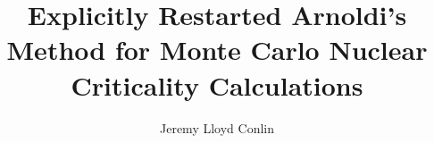 \documentclass[12pt]{JLCthesis}
\title{Explicitly Restarted Arnoldi's Method for Monte Carlo Nuclear Criticality Calculations}
\author{Jeremy Lloyd Conlin}
\begin{document}
\frontmatter



\mainmatter
\begin{comment}
\pagediagram
\currentpage
\reversemarginpartrue
\pagedesign

The textwidth is \printinunitsof{pt}\prntlen{\textwidth} which is also \printinunitsof{in}\prntlen{\textwidth} or \printinunitsof{mm}\prntlen{\textwidth}. 

The textheight is \printinunitsof{pt}\prntlen{\textheight} which is also \printinunitsof{in}\prntlen{\textheight} or \printinunitsof{mm}\prntlen{\textheight}. 
\end{comment}












\appendix
\renewcommand{\chaptername}{\appendixname}



\backmatter


\end{document}
